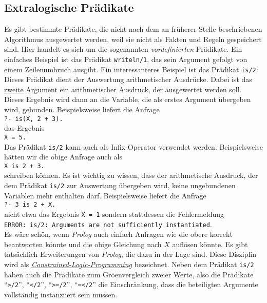 \subsection{Extralogische Pr\"{a}dikate}
Es gibt bestimmte Pr\"{a}dikate, die nicht nach dem an fr\"{u}herer Stelle beschriebenen Algorithmus
ausgewertet werden, weil sie nicht als Fakten und Regeln gespeichert sind.  Hier handelt es sich um
die sogenannten \emph{vordefinierten} Pr\"{a}dikate.  Ein einfaches Beispiel ist das Pr\"{a}dikat
\texttt{writeln/1}, das sein Argument gefolgt von einem Zeilenumbruch ausgibt.  Ein interessanteres
Beispiel ist das Pr\"{a}dikat \texttt{is/2}: Dieses Pr\"{a}dikat dient der Auswertung arithmetischer
Ausdr\"{u}cke.  Dabei ist das \underline{zweite} Argument ein arithmetischer Ausdruck, der ausgewertet
werden soll.  Dieses Ergebnis wird dann an die Variable, die als erstes Argument \"{u}bergeben wird,
gebunden.  Beispielsweise liefert die Anfrage
\\[0.2cm]
\hspace*{1.3cm}
\texttt{?- is(X, 2 + 3).}
\\[0.2cm]
das Ergebnis
\\[0.2cm]
\hspace*{1.3cm}
\texttt{X = 5.}
\\[0.2cm]
Das Pr\"{a}dikat \texttt{is/2} kann auch als Infix-Operator verwendet werden.  Beispielsweise h\"{a}tten wir
die obige Anfrage auch als
\\[0.2cm]
\hspace*{1.3cm}
\texttt{X is 2 + 3.}
\\[0.2cm]
schreiben k\"{o}nnen.  Es ist wichtig zu wissen, dass der arithmetische Ausdruck, der dem Pr\"{a}dikat
\texttt{is/2} zur Auswertung \"{u}bergeben wird, keine ungebundenen Variablen mehr enthalten darf.
Beispielsweise liefert die Anfrage
\\[0.2cm]
\hspace*{1.3cm}
\texttt{?- 3 is 2 + X.}
\\[0.2cm]
nicht etwa das Ergebnis \texttt{X = 1} sondern stattdessen die Fehlermeldung
\\[0.2cm]
\hspace*{1.3cm}
\texttt{ERROR: is/2: Arguments are not sufficiently instantiated}.
\\[0.2cm]
Es w\"{a}re sch\"{o}n, wenn \textsl{Prolog} auch einfach Anfragen wie die obere korrekt beantworten k\"{o}nnte
und die obige Gleichung nach $X$ aufl\"{o}sen k\"{o}nnte.  Es gibt tats\"{a}chlich Erweiterungen von
\textsl{Prolog}, die dazu in der Lage sind.  Diese Disziplin wird als
\href{http://en.wikipedia.org/wiki/Constraint_logic_programming}{\emph{Constrained-Logic-Programming}} bezeichnet.
Neben dem Pr\"{a}dikat \texttt{is/2} haben auch die Pr\"{a}dikate zum Gr\"{o}\3envergleich zweier Werte, also die
Pr\"{a}dikate ``\texttt{>/2}'', ``\texttt{</2}'', ``\texttt{>=/2}'', ``\texttt{=</2}'' die
Einschr\"{a}nkung, dass die beteiligten Argumente vollst\"{a}ndig instanziiert sein m\"{u}ssen.

